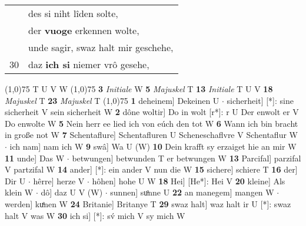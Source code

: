 \documentclass[8pt,a4paper,notitlepage]{article}
\begin{document}
\begin{table}[ht]
\begin{minipage}[t]{0.5\linewidth}
\begin{tabular}{rl}
 & des si niht lîden solte,\\ 
 & der \textbf{vuoge} erkennen wolte,\\ 
 & unde sagir, swaz halt mir geschehe,\\ 
30 & daz \textbf{ich si} niemer vrô gesehe,\\ 
\end{tabular}
\scriptsize
\line(1,0){75} \newline
T U V W \newline
\line(1,0){75} \newline
\textbf{3} \textit{Initiale} W  \textbf{5} \textit{Majuskel} T  \textbf{13} \textit{Initiale} T U V  \textbf{18} \textit{Majuskel} T  \textbf{23} \textit{Majuskel} T  \newline
\line(1,0){75} \newline
\textbf{1} deheinem] Dekeinen U  $\cdot$ sicherheit] [*]: sine sicherheit V sein sicherheit W \textbf{2} dône woltir] Do in wolt [r*]: r U Der enwolt er V Do enwolte W \textbf{5} Nein herr ee lied ich von eúch den tot W \textbf{6} Wann ich bin bracht in große not W \textbf{7} Schentaflure] Schentafluren U Scheneschaflvre V Schentaflur W  $\cdot$ ich nam] nam ich W \textbf{9} swâ] Wa U (W) \textbf{10} Dein krafft sy erzaiget hie an mir W \textbf{11} unde] Das W  $\cdot$ betwungen] betwunden T er betwungen W \textbf{13} Parcifal] parzifal V partzifal W \textbf{14} ander] [*]: ein ander V nun die W \textbf{15} sichere] schiere T \textbf{16} der] Dir U  $\cdot$ hêrre] herze V  $\cdot$ hôhen] hohe U W \textbf{18} Hei] [He*]: Hei V \textbf{20} kleine] Als klein W  $\cdot$ dô] daz U V (W)  $\cdot$ sunnen] suͦnne U \textbf{22} an manegem] mangen W  $\cdot$ werden] kuͤnen W \textbf{24} Britanie] Britanye T \textbf{29} swaz halt] waz halt ir U [*]: swaz halt V was W \textbf{30} ich si] [*]: sv́ mich V sy mich W \newline
\end{minipage}
\end{table}
\end{document}
